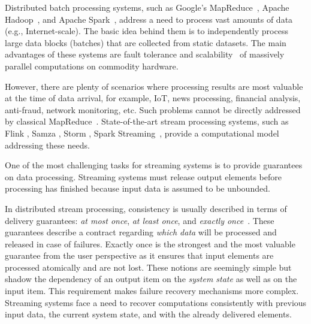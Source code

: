 
\label {fs-intro-seciton}

Distributed batch processing systems, such as Google's MapReduce~\cite{Dean:2008:MSD:1327452.1327492}, Apache Hadoop~\cite{hadoop2009hadoop}, and Apache Spark~\cite{Zaharia:2016:ASU:3013530.2934664}, address a need to process vast amounts of data (e.g., Internet-scale). 
The basic   idea behind them is to independently process large data blocks (batches) that are collected from static datasets. 
The main advantages of these systems are fault tolerance and scalability~\cite{borthakur2011apache} of massively parallel computations on commodity hardware.

However, there are plenty of scenarios where processing results are most valuable at the time of data arrival, for example, IoT, news processing, financial analysis, anti-fraud, network monitoring, etc. 
Such problems cannot be directly addressed by classical MapReduce~\cite{Doulkeridis:2014:SLA:2628707.2628782}. 
State-of-the-art stream processing systems, such as Flink \cite{carbone2015apache}, Samza \cite{Noghabi:2017:SSS:3137765.3137770}, Storm \cite{apache:storm}, Spark Streaming~\cite{Zaharia:2012:DSE:2342763.2342773},   provide a computational model addressing these needs.

One of the most challenging tasks for streaming systems is to provide guarantees on data processing. 
Streaming systems must release output elements before processing has finished because input data is assumed to be unbounded. 

In distributed stream processing, consistency is usually described in terms of delivery guarantees: {\em at most once}, {\em at least once}, and {\em exactly once}~\cite{carbone2015apache}. 
These guarantees describe a contract regarding {\em which data} will be  processed and released in case of failures. 
Exactly once is the strongest and the most valuable guarantee from the user perspective as it ensures that input elements are processed atomically and are not lost. These notions are seemingly simple but shadow  the dependency   of  an output item on the {\em system state} as well as on the  input item. 
This requirement makes failure recovery mechanisms more complex. 
Streaming systems face a need to recover computations consistently with previous input data, the current system state, and with the already delivered elements.

